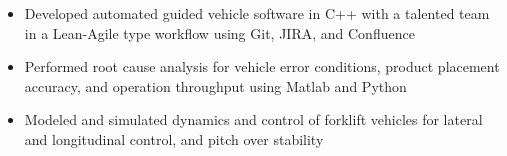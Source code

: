 	\begin{itemize} [leftmargin = \itemmargin]
		\item Developed automated guided vehicle software in C++ with a talented team in a Lean-Agile type workflow using Git, JIRA, and Confluence
		
		\item Performed root cause analysis for vehicle error conditions, product placement accuracy, and operation throughput using Matlab and Python

		\item Modeled and simulated dynamics and control of forklift vehicles for lateral and longitudinal control, and pitch over stability
		
	\end{itemize} \\